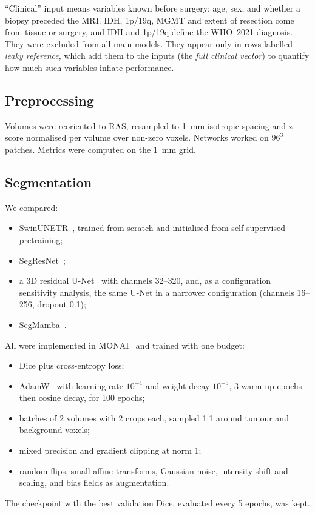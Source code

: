 \documentclass[11pt]{article}
\begin{document}
``Clinical'' input means variables known before surgery: age, sex, and whether a biopsy preceded the MRI.
IDH, 1p/19q, MGMT and extent of resection come from tissue or surgery, and IDH and 1p/19q define the WHO~2021
diagnosis. They were excluded from all main models. They appear only in rows labelled \emph{leaky reference}, which
add them to the inputs (the \emph{full clinical vector}) to quantify how much such variables inflate performance.

\subsection{Preprocessing}
Volumes were reoriented to RAS, resampled to 1~mm isotropic spacing and z-score normalised per volume over non-zero
voxels. Networks worked on $96^3$ patches. Metrics were computed on the 1~mm grid.

\subsection{Segmentation}
\label{sec:seg}
We compared:
\begin{itemize}
  \item SwinUNETR~\cite{hatamizadeh2022swinunetr}, trained from scratch and initialised from self-supervised
        pretraining;
  \item SegResNet~\cite{myronenko2019segresnet};
  \item a 3D residual U-Net~\cite{cicek2016unet3d} with channels 32--320, and, as a configuration sensitivity
        analysis, the same U-Net in a narrower configuration (channels 16--256, dropout 0.1);
  \item SegMamba~\cite{xing2024segmamba,gu2023mamba}.
\end{itemize}
All were implemented in MONAI~\cite{cardoso2022monai} and trained with one budget:
\begin{itemize}
  \item Dice plus cross-entropy loss;
  \item AdamW~\cite{loshchilov2019adamw} with learning rate $10^{-4}$ and weight decay $10^{-5}$, 3 warm-up epochs then
        cosine decay, for 100 epochs;
  \item batches of 2 volumes with 2 crops each, sampled 1:1 around tumour and background voxels;
  \item mixed precision and gradient clipping at norm 1;
  \item random flips, small affine transforms, Gaussian noise, intensity shift and scaling, and bias fields as
        augmentation.
\end{itemize}
The checkpoint with the best validation Dice, evaluated every 5 epochs, was kept.
\end{document}

